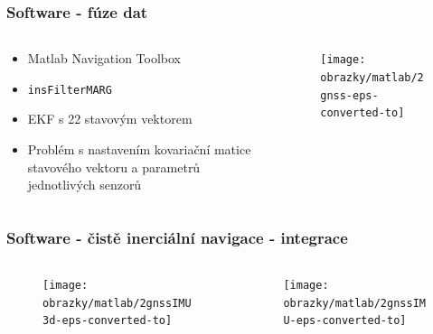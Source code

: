\documentclass[%
  12pt,       				%
	t,                  %
	aspectratio=1610,   %
	unicode,						%
]{beamer}				    	%
\begin{document}
\begin{frame} 
	\frametitle{Software - fúze dat}
	
	\begin{columns}[T] 								%
		\begin{column}{0.5\textwidth}		%
			
			\begin{itemize}
				\item Matlab Navigation Toolbox
				\item  \texttt{insFilterMARG}
				\item EKF s 22 stavovým vektorem
				\item Problém s nastavením kovariační matice stavového vektoru a parametrů jednotlivých senzorů
				
				
			\end{itemize}
		\end{column}
		\begin{column}{0.5\textwidth}		%
			\begin{figure}%
				\centering
			    \texttt{[image: obrazky/matlab/2gnss-eps-converted-to]}
			\end{figure}


		\end{column}
		

	\end{columns}											%
\end{frame}

\begin{frame} 
	\frametitle{Software - čistě inerciální navigace - integrace}
	\begin{columns}[T] 								%
		\begin{column}{0.5\textwidth}		%
		\begin{figure}%
		\centering
		\texttt{[image: obrazky/matlab/2gnssIMU3d-eps-converted-to]}
		\end{figure}

		\end{column}
		\begin{column}{0.5\textwidth}		%
		\begin{figure}%
		\centering
		\texttt{[image: obrazky/matlab/2gnssIMU-eps-converted-to]}
		\end{figure}
		\end{column}
	\end{columns}	
\end{frame}
\end{document}
